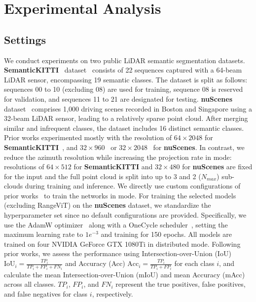 \section{Experimental Analysis}
\subsection{Settings}
We conduct experiments on two public LiDAR semantic segmentation datasets. \textbf{SemanticKITTI}~\cite{behley2019semantickitti} dataset~\cite{behley2019semantickitti} consists of 22 sequences captured with a 64-beam LiDAR sensor, encompassing 19 semantic classes. The dataset is split as follows: sequences 00 to 10 (excluding 08) are used for training, sequence 08 is reserved for validation, and sequences 11 to 21 are designated for testing. \textbf{nuScenes} dataset~\cite{caesar2020nuscenes} comprises 1,000 driving scenes recorded in Boston and Singapore using a 32-beam LiDAR sensor, leading to a relatively sparse point cloud. After merging similar and infrequent classes, the dataset includes 16 distinct semantic classes.
Prior works experimented mostly with the resolution of $64\times2048$ for \textbf{SemanticKITTI}~\cite{cheng2022cenet, 2019rangenet++, cortinhal2020salsanext}, and $32\times960$~\cite{kong2023rethinking} or $32 \times 2048$~\cite{ando2023rangevit} for \textbf{nuScenes}. In contrast, we reduce the azimuth resolution while increasing the projection rate in \coolname{} mode: resolutions of $64 \times 512$ for \textbf{SemanticKITTI} and $32 \times 480$ for \textbf{nuScenes} are fixed for the input and the full point cloud is split into up to 3 and 2 ($N_{max}$) sub-clouds during training and inference. We directly use custom configurations of prior works~\cite{zhao2021fidnet, cheng2022cenet, cortinhal2020salsanext, ando2023rangevit} to train the networks in \coolname{} mode. For training the selected models (excluding RangeViT) on the \textbf{nuScenes} dataset, we standardize the hyperparameter set since no default configurations are provided. Specifically, we use the AdamW optimizer~\cite{loshchilov2017adamw} along with a OneCycle scheduler~\cite{smith2017onecycle}, setting the maximum learning rate to $1e^{-3}$ and training for 150 epochs. All models are trained on four NVIDIA GeForce GTX 1080Ti in distributed mode.
Following prior works, we assess the performance using Intersection-over-Union (IoU) $\text{IoU}_i = \frac{TP_i}{TP_i + FP_i + FN_i}$ and Accuracy (Acc) $\text{Acc}_i = \frac{TP_i}{TP_i + FP_i}$ for each class \( i \), and calculate the mean Intersection-over-Union (mIoU) and mean Accuracy (mAcc) across all classes. \( TP_i \), \( FP_i \), and \( FN_i \) represent the true positives, false positives, and false negatives for class \( i \), respectively.

